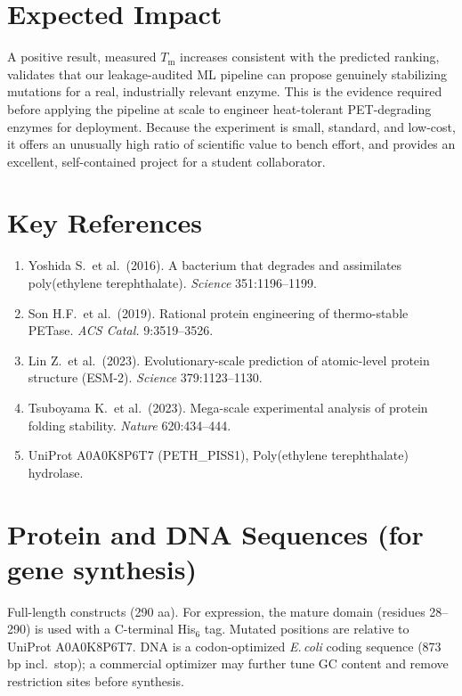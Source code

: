 \documentclass[11pt]{article}
\begin{document}
\section{Expected Impact}
A positive result, measured $T_\mathrm{m}$ increases consistent with the predicted ranking,
validates that our leakage-audited ML pipeline can propose genuinely stabilizing mutations for
a real, industrially relevant enzyme. This is the evidence required before applying the pipeline
at scale to engineer heat-tolerant PET-degrading enzymes for deployment. Because the experiment
is small, standard, and low-cost, it offers an unusually high ratio of scientific value to bench
effort, and provides an excellent, self-contained project for a student collaborator.

\section{Key References}
\begin{enumerate}
\item Yoshida S.\ et al.\ (2016). A bacterium that degrades and assimilates poly(ethylene
terephthalate). \emph{Science} 351:1196--1199.
\item Son H.F.\ et al.\ (2019). Rational protein engineering of thermo-stable PETase.
\emph{ACS Catal.} 9:3519--3526.
\item Lin Z.\ et al.\ (2023). Evolutionary-scale prediction of atomic-level protein structure
(ESM-2). \emph{Science} 379:1123--1130.
\item Tsuboyama K.\ et al.\ (2023). Mega-scale experimental analysis of protein folding
stability. \emph{Nature} 620:434--444.
\item UniProt A0A0K8P6T7 (PETH\_PISS1), Poly(ethylene terephthalate) hydrolase.
\end{enumerate}

\appendix
\section{Protein and DNA Sequences (for gene synthesis)}
Full-length constructs (290 aa). For expression, the mature domain (residues 28--290) is used
with a C-terminal His$_6$ tag. Mutated positions are relative to UniProt A0A0K8P6T7. DNA is a
codon-optimized \emph{E.\,coli} coding sequence (873 bp incl.\ stop); a commercial optimizer may
further tune GC content and remove restriction sites before synthesis.

\small
\end{document}
